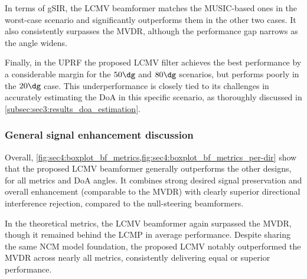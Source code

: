 In terms of gSIR, the LCMV beamformer matches the MUSIC-based ones in the worst-case scenario and significantly outperforms them in the other two cases. It also consistently surpasses the MVDR, although the performance gap narrows as the angle widens.

Finally, in the UPRF the proposed LCMV filter achieves the best performance by a considerable margin for the $50\dg$ and $80\dg$ scenarios, but performs poorly in the $20\dg$ case. This underperformance is closely tied to its challenges in accurately estimating the DoA in this specific scenario, as thoroughly discussed in \cref{subsec:sec3:results_doa_estimation}.



\subsubsection*{General signal enhancement discussion}

Overall, \cref{fig:sec4:boxplot_bf_metrics,fig:sec4:boxplot_bf_metrics_per-dir} show that the proposed LCMV beamformer generally outperforms the other designs, for all metrics and DoA angles. It combines strong desired signal preservation and overall enhancement (comparable to the MVDR) with clearly superior directional interference rejection, compared to the null-steering beamformers.

In the theoretical metrics, the LCMV beamformer again surpassed the MVDR, though it remained behind the LCMP in average performance. Despite sharing the same NCM model foundation, the proposed LCMV notably outperformed the MVDR across nearly all metrics, consistently delivering equal or superior performance.